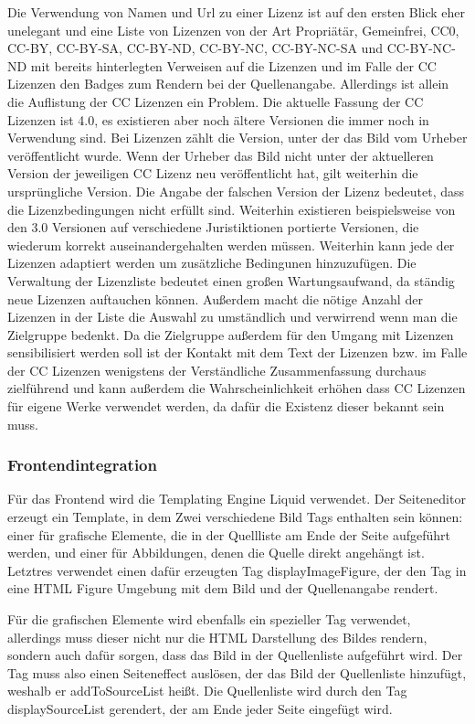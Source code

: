 Die Verwendung von Namen und Url zu einer Lizenz ist auf den ersten Blick eher
unelegant und eine Liste von Lizenzen von der Art Propriätär, Gemeinfrei, CC0,
CC-BY, CC-BY-SA, CC-BY-ND, CC-BY-NC, CC-BY-NC-SA und CC-BY-NC-ND mit bereits
hinterlegten Verweisen auf die Lizenzen und im Falle der CC Lizenzen den Badges
zum Rendern bei der Quellenangabe. Allerdings ist allein die Auflistung der CC
Lizenzen ein Problem. Die aktuelle Fassung der CC Lizenzen ist 4.0, es
existieren aber noch ältere Versionen die immer noch in Verwendung sind. Bei
Lizenzen zählt die Version, unter der das Bild vom Urheber veröffentlicht wurde.
Wenn der Urheber das Bild nicht unter der aktuelleren Version der jeweiligen CC
Lizenz neu veröffentlicht hat, gilt weiterhin die ursprüngliche Version. Die
Angabe der falschen Version der Lizenz bedeutet, dass die Lizenzbedingungen
nicht erfüllt sind. Weiterhin existieren beispielsweise von den 3.0 Versionen
auf verschiedene Juristiktionen portierte Versionen, die wiederum korrekt
auseinandergehalten werden müssen. Weiterhin kann jede der Lizenzen adaptiert
werden um zusätzliche Bedingunen hinzuzufügen. Die Verwaltung der Lizenzliste
bedeutet einen großen Wartungsaufwand, da ständig neue Lizenzen auftauchen
können. Außerdem macht die nötige Anzahl der Lizenzen in der Liste die Auswahl
zu umständlich und verwirrend wenn man die Zielgruppe bedenkt. Da die Zielgruppe
außerdem für den Umgang mit Lizenzen sensibilisiert werden soll ist der Kontakt
mit dem Text der Lizenzen bzw. im Falle der CC Lizenzen wenigstens der
Verständliche Zusammenfassung durchaus zielführend und kann außerdem die
Wahrscheinlichkeit erhöhen dass CC Lizenzen für eigene Werke verwendet werden,
da dafür die Existenz dieser bekannt sein muss.

\subsubsection{Frontendintegration}

Für das Frontend wird die Templating Engine Liquid verwendet. Der Seiteneditor
erzeugt ein Template, in dem Zwei verschiedene Bild Tags enthalten sein können:
einer für grafische Elemente, die in der Quellliste am Ende der Seite aufgeführt
werden, und einer für Abbildungen, denen die Quelle direkt angehängt ist.
Letztres verwendet einen dafür erzeugten Tag displayImageFigure, der den Tag in
eine HTML Figure Umgebung mit dem Bild und der Quellenangabe rendert.

Für die grafischen Elemente wird ebenfalls ein spezieller Tag verwendet,
allerdings muss dieser nicht nur die HTML Darstellung des Bildes rendern,
sondern auch dafür sorgen, dass das Bild in der Quellenliste aufgeführt wird.
Der Tag muss also einen Seiteneffect auslösen, der das Bild der Quellenliste
hinzufügt, weshalb er addToSourceList heißt. Die Quellenliste wird durch den Tag
displaySourceList gerendert, der am Ende jeder Seite eingefügt wird.

